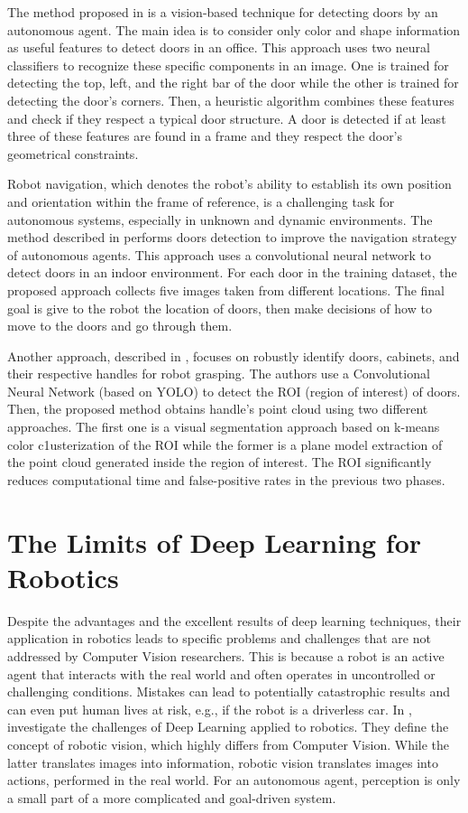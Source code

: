  The method proposed in \cite{detectdoorsfeature} is a vision-based technique for detecting doors by an autonomous agent. The main idea is to consider only color and shape information as useful features to detect doors in an office. This approach uses two neural classifiers to recognize these specific components in an image. One is trained for detecting the top, left, and the right bar of the door while the other is trained for detecting the door's corners. Then, a heuristic algorithm combines these features and check if they respect a typical door structure. A door is detected if at least three of these features are found in a frame and they respect the door's geometrical constraints. 
 
 Robot navigation, which denotes the robot's ability to establish its own position and orientation within the frame of reference, is a challenging task for autonomous systems, especially in unknown and dynamic environments. The method described in \cite{doorsandnavigation} performs doors detection to improve the navigation strategy of autonomous agents. This approach uses a convolutional neural network to detect doors in an indoor environment. For each door in the training dataset, the proposed approach collects five images taken from different locations. The final goal is give to the robot the location of doors, then make decisions of how to move to the doors and go through them.
 
 Another approach, described in \cite{doorcabinet}, focuses on robustly identify doors, cabinets, and their respective handles for robot grasping. The authors use a Convolutional Neural Network (based on YOLO) to detect the ROI (region of interest) of doors. Then, the proposed method obtains handle's point cloud using two different approaches. The first one is a visual segmentation approach based on k-means color c1usterization of the ROI while the former is a plane model extraction of the point cloud generated inside the region of interest. The ROI significantly reduces computational time and false-positive rates in the previous two phases.
 
 \section{The Limits of Deep Learning for Robotics}
 
 Despite the advantages and the excellent results of deep learning techniques, their application in robotics leads to specific problems and challenges that are not addressed by Computer Vision researchers. This is because a robot is an active agent that interacts with the real world and often operates in uncontrolled or challenging conditions. Mistakes can lead to potentially catastrophic results and can even put human lives at risk, e.g., if the robot is a driverless car. In \cite{surveydeeplimits}, \citeauthor{surveydeeplimits} investigate the challenges of Deep Learning applied to robotics. They define the concept of robotic vision, which highly differs from Computer Vision. While the latter translates images into information, robotic vision translates images into actions, performed in the real world. For an autonomous agent, perception is only a small part of a more complicated and goal-driven system. 
 
